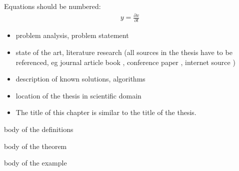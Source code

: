 Equations should be numbered:
\begin{align}
y = \frac{\partial x}{\partial t}
\end{align}

\begin{itemize}
\item problem analysis, problem statement
\item state of the art, literature research (all sources in the thesis have to be referenced, eg journal article \cite{bib:article} book \cite{bib:book}, conference paper \cite{bib:conference}, internet source \cite{bib:internet})
\item description of known solutions, algorithms
\item location of the thesis in scientific domain
\item The title of this chapter is similar to the title of the thesis.
\end{itemize}

\begin{Definition}\label{def:definition}
body of the definitions
\end{Definition}

\begin{Theorem}\label{t:theorem}
body of the theorem
\end{Theorem}

\begin{Example}\label{ex:example}
body of the example
\end{Example}



